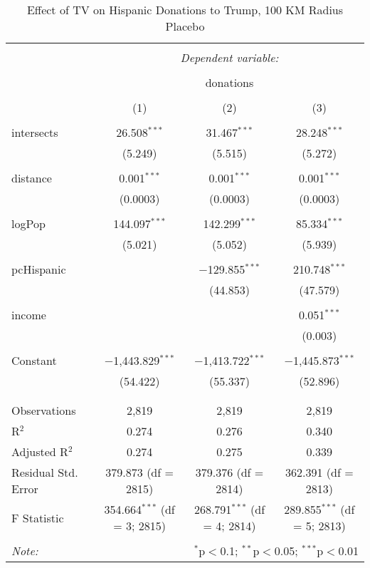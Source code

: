 
\begin{table}[!htbp] \centering 
  \caption{Effect of TV on Hispanic Donations to Trump, 100 KM Radius Placebo} 
  \label{} 
\begin{tabular}{@{\extracolsep{5pt}}lccc} 
\\[-1.8ex]\hline 
\hline \\[-1.8ex] 
 & \multicolumn{3}{c}{\textit{Dependent variable:}} \\ 
\cline{2-4} 
\\[-1.8ex] & \multicolumn{3}{c}{donations} \\ 
\\[-1.8ex] & (1) & (2) & (3)\\ 
\hline \\[-1.8ex] 
 intersects & 26.508$^{***}$ & 31.467$^{***}$ & 28.248$^{***}$ \\ 
  & (5.249) & (5.515) & (5.272) \\ 
  & & & \\ 
 distance & 0.001$^{***}$ & 0.001$^{***}$ & 0.001$^{***}$ \\ 
  & (0.0003) & (0.0003) & (0.0003) \\ 
  & & & \\ 
 logPop & 144.097$^{***}$ & 142.299$^{***}$ & 85.334$^{***}$ \\ 
  & (5.021) & (5.052) & (5.939) \\ 
  & & & \\ 
 pcHispanic &  & $-$129.855$^{***}$ & 210.748$^{***}$ \\ 
  &  & (44.853) & (47.579) \\ 
  & & & \\ 
 income &  &  & 0.051$^{***}$ \\ 
  &  &  & (0.003) \\ 
  & & & \\ 
 Constant & $-$1,443.829$^{***}$ & $-$1,413.722$^{***}$ & $-$1,445.873$^{***}$ \\ 
  & (54.422) & (55.337) & (52.896) \\ 
  & & & \\ 
\hline \\[-1.8ex] 
Observations & 2,819 & 2,819 & 2,819 \\ 
R$^{2}$ & 0.274 & 0.276 & 0.340 \\ 
Adjusted R$^{2}$ & 0.274 & 0.275 & 0.339 \\ 
Residual Std. Error & 379.873 (df = 2815) & 379.376 (df = 2814) & 362.391 (df = 2813) \\ 
F Statistic & 354.664$^{***}$ (df = 3; 2815) & 268.791$^{***}$ (df = 4; 2814) & 289.855$^{***}$ (df = 5; 2813) \\ 
\hline 
\hline \\[-1.8ex] 
\textit{Note:}  & \multicolumn{3}{r}{$^{*}$p$<$0.1; $^{**}$p$<$0.05; $^{***}$p$<$0.01} \\ 
\end{tabular} 
\end{table} 
